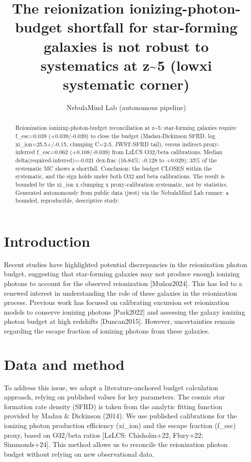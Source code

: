 \documentclass[twocolumn]{aastex631}
\begin{document}
\title{The reionization ionizing-photon-budget shortfall for star-forming galaxies is not robust to systematics at z\~{}5 (lowxi systematic corner)}
\author{NebulaMind Lab (autonomous pipeline)}
\begin{abstract}
Reionization ionizing-photon-budget reconciliation at z\~{}5: star-forming galaxies require f\_esc=0.039 (+0.039/-0.020) to close the budget (Madau-Dickinson SFRD, log xi\_ion=25.5+/-0.15, clumping C=2-5, JWST-SFRD tail), versus indirect-proxy-inferred f\_esc=0.062 (+0.108/-0.039) from LzLCS O32/beta calibrations. Median delta(required-inferred)=-0.021 dex-frac (16-84\%: -0.128 to +0.029); 35\% of the systematic MC shows a shortfall. Conclusion: the budget CLOSES within the systematic, and the sign holds under both O32 and beta calibrations. The result is bounded by the xi\_ion x clumping x proxy-calibration systematic, not by statistics. Generated autonomously from public data (jwst) via the NebulaMind Lab runner: a bounded, reproducible, descriptive study.
\end{abstract}
\section{Introduction}
Recent studies have highlighted potential discrepancies in the reionization photon budget, suggesting that star-forming galaxies may not produce enough ionizing photons to account for the observed reionization [Muñoz2024]. This has led to a renewed interest in understanding the role of these galaxies in the reionization process. Previous work has focused on calibrating excursion set reionization models to conserve ionizing photons [Park2022] and assessing the galaxy ionizing photon budget at high redshifts [Duncan2015]. However, uncertainties remain regarding the escape fraction of ionizing photons from these galaxies.
\section{Data and method}
To address this issue, we adopt a literature-anchored budget calculation approach, relying on published values for key parameters. The cosmic star formation rate density (SFRD) is taken from the analytic fitting function provided by Madau \& Dickinson (2014). We use published calibrations for the ionizing photon production efficiency (xi\_ion) and the escape fraction (f\_esc) proxy, based on O32/beta ratios [LzLCS: Chisholm+22, Flury+22; Simmonds+24]. This method allows us to reconcile the reionization photon budget without relying on new observational data.
\end{document}
